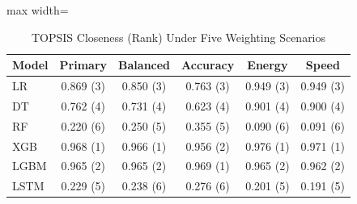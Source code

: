 \begin{table}[!htb]
\centering
\caption{TOPSIS Closeness (Rank) Under Five Weighting Scenarios}
\label{tab:sensitivity}
\footnotesize
\setlength{\tabcolsep}{4pt}
\begin{adjustbox}{max width=\columnwidth}
\begin{tabular}{lccccc}
\toprule
Model & Primary & Balanced & Accuracy & Energy & Speed \\
\midrule
LR & 0.869 (3) & 0.850 (3) & 0.763 (3) & 0.949 (3) & 0.949 (3) \\
DT & 0.762 (4) & 0.731 (4) & 0.623 (4) & 0.901 (4) & 0.900 (4) \\
RF & 0.220 (6) & 0.250 (5) & 0.355 (5) & 0.090 (6) & 0.091 (6) \\
XGB & 0.968 (1) & 0.966 (1) & 0.956 (2) & 0.976 (1) & 0.971 (1) \\
LGBM & 0.965 (2) & 0.965 (2) & 0.969 (1) & 0.965 (2) & 0.962 (2) \\
LSTM & 0.229 (5) & 0.238 (6) & 0.276 (6) & 0.201 (5) & 0.191 (5) \\
\bottomrule
\end{tabular}
\end{adjustbox}
\end{table}

